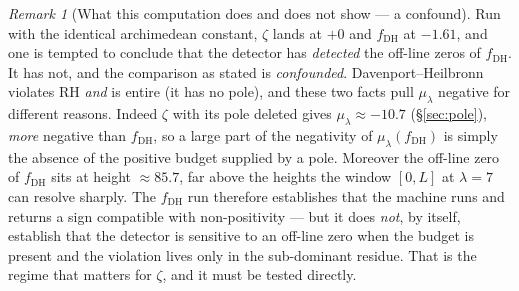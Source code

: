\documentclass[11pt]{amsart}
\theoremstyle{definition}
\theoremstyle{remark}
\newtheorem{remark}[theorem]{Remark}
\newcommand{\lam}{\lambda}
\begin{document}
\begin{remark}[What this computation does and does not show --- a confound]\label{rem:confound}
Run with the identical archimedean constant, $\zeta$ lands at $+0$ and $f_{\mathrm{DH}}$ at $-1.61$, and one is tempted to conclude that the detector has \emph{detected} the off-line zeros of $f_{\mathrm{DH}}$. It has not, and the comparison as stated is \emph{confounded}. Davenport--Heilbronn violates RH \emph{and} is entire (it has no pole), and these two facts pull $\mu_\lam$ negative for different reasons. Indeed $\zeta$ with its pole deleted gives $\mu_\lam\approx-10.7$ (\S\ref{sec:pole}), \emph{more} negative than $f_{\mathrm{DH}}$, so a large part of the negativity of $\mu_\lam(f_{\mathrm{DH}})$ is simply the absence of the positive budget supplied by a pole. Moreover the off-line zero of $f_{\mathrm{DH}}$ sits at height $\approx 85.7$, far above the heights the window $[0,L]$ at $\lam=7$ can resolve sharply. The $f_{\mathrm{DH}}$ run therefore establishes that the machine runs and returns a sign compatible with non-positivity --- but it does \emph{not}, by itself, establish that the detector is sensitive to an off-line zero when the budget is present and the violation lives only in the sub-dominant residue. That is the regime that matters for $\zeta$, and it must be tested directly.
\end{remark}
\end{document}
